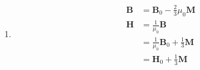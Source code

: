 \documentclass{article}
\renewcommand{\vec}[1]{\boldsymbol{\mathbf{#1}}}
\begin{document}
\subsection{}

\begin{enumerate}
  \item

        \begin{align*}
          \vec{B} & = \vec{B}_0 - \frac{2}{3} \mu_0 \vec{M}           \\
          \vec{H} & = \frac{1}{\mu_0} \vec{B}                         \\
                  & = \frac{1}{\mu_0} \vec{B}_0 + \frac{1}{3} \vec{M} \\
                  & = \vec{H}_0 + \frac{1}{3} \vec{M}
        \end{align*}
\end{enumerate}

\setcounter{subsection}{15}
\subsection{}
\end{document}
